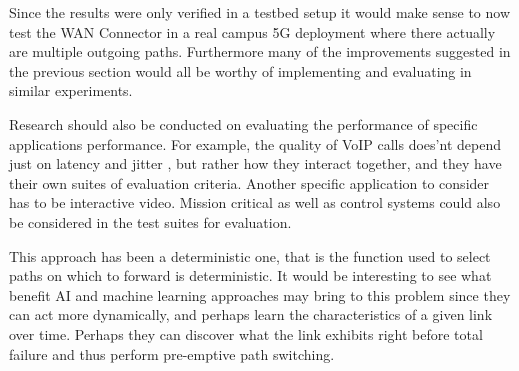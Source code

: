Since the results were only verified in a testbed setup it would make sense to now test the WAN Connector in a real campus 5G deployment where there actually are multiple outgoing paths. Furthermore many of the improvements suggested in the previous section would all be worthy of implementing and evaluating in similar experiments.

Research should also be conducted on evaluating the performance of specific applications performance. For example, the quality of VoIP calls does'nt depend just on latency and jitter \cite{voip-measurement}, but rather how they interact together, and they have their own suites of evaluation criteria. Another specific application to consider has to be interactive video. Mission critical as well as control systems could also be considered in the test suites for evaluation.

This approach has been a deterministic one, that is the function used to select paths on which to forward is deterministic. It would be interesting to see what benefit AI and machine learning approaches may bring to this problem since they can act more dynamically, and perhaps learn the characteristics of a given link over time. Perhaps they can discover what the link exhibits right before total failure and thus perform pre-emptive path switching.